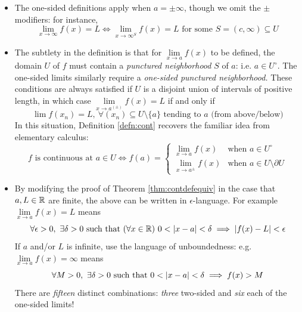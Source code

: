 \begin{itemize}
  \item The one-sided definitions apply when $a=\pm\infty$, though we omit the $\pm$ modifiers: for instance,
  \[\lim_{x\to\infty}f(x)=L\iff \lim\limits_{x\to\infty^S}f(x)=L\text{ for some }S=(c,\infty)\subseteq U\]
	\item\label{it:contlimit} The subtlety in the definition is that for  $\lim\limits_{x\to a}f(x)$ to be defined, the domain $U$ of $f$ must contain a \emph{punctured neighborhood} $S$ of $a$: i.e. $a\in U^\circ$. The one-sided limits similarly require a \emph{one-sided punctured neighborhood.} These conditions are always satisfied if $U$ is a disjoint union of intervals of positive length, in which case $\lim\limits_{x\to a^{(\pm)}}f(x)=L$ if and only if
  \[\lim f(x_n)=L,\ \forall (x_n)\subseteq U\setminus\{a\} \text{ tending to  $a$ (from above/below)}\]
  In this situation, Definition \ref{defn:cont} recovers the familiar idea from elementary calculus:
  \[f \text{ is continuous at } a\in U\iff f(a)=\begin{cases}
  \lim\limits_{x\to a} f(x)&\text{when }a\in U^\circ\\
  \lim\limits_{x\to a^\pm} f(x)&\text{when }a\in U\setminus\partial U
  \end{cases} \tag{$\ast$}\]
  \item By modifying the proof of Theorem \ref{thm:contdefequiv} in the case that $a,L\in\mathbb{R}$ are finite, the above can be written in $\epsilon$-language. For example $\lim\limits_{x\to a}f(x)=L$ means
  \[\forall\epsilon>0,\ \exists \delta>0\text{ such that }(\forall x\in\R)\ 0<\nm{x-a}<\delta\implies \nm{f(x)-L}<\epsilon\]
  If $a$ and/or $L$ is infinite, use the language of unboundedness: e.g. $\lim\limits_{x\to a}f(x)=\infty$ means
  \[\forall M>0,\ \exists \delta>0\text{ such that }0<\left| x-a\right|<\delta\implies f(x)>M\]
  There are \emph{fifteen} distinct combinations: \emph{three} two-sided and \emph{six} each of the one-sided limits!
\end{itemize}\goodbreak



